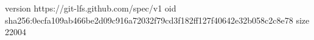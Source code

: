 version https://git-lfs.github.com/spec/v1
oid sha256:0ecfa109ab466be2d09c916a72032f79cd3f182ff127f40642e32b058c2c8e78
size 22004
